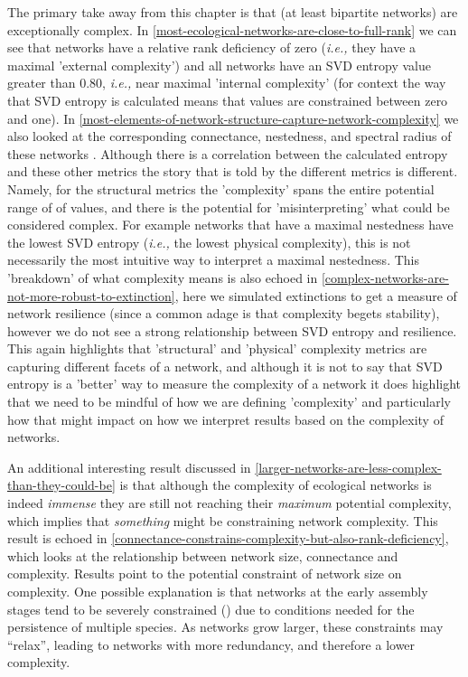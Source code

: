 \begin{refsection}
The primary take away from this chapter is that (at least bipartite networks) are exceptionally complex. In \autoref{most-ecological-networks-are-close-to-full-rank} we can see that networks have a relative rank deficiency of zero (\emph{i.e.,} they have a maximal 'external complexity') and all networks have an SVD entropy value greater than 0.80, \emph{i.e.,} near maximal 'internal complexity' (for context the way that SVD entropy is calculated means that values are constrained between zero and one). In \autoref{most-elements-of-network-structure-capture-network-complexity} we also looked at the corresponding connectance, nestedness, and spectral radius of these networks . Although there is a correlation between the calculated entropy and these other metrics the story that is told by the different metrics is different. Namely, for the structural metrics the 'complexity' spans the entire potential range of of values, and there is the potential for 'misinterpreting' what could be considered complex. For example networks that have a maximal nestedness have the lowest SVD entropy (\emph{i.e.,} the lowest physical complexity), this is not necessarily the most intuitive way to interpret a maximal nestedness. This 'breakdown' of what complexity means is also echoed in \autoref{complex-networks-are-not-more-robust-to-extinction}, here we simulated extinctions to get a measure of network resilience (since a common adage is that complexity begets stability), however we do not see a strong relationship between SVD entropy and resilience. This again highlights that 'structural' and 'physical' complexity metrics are capturing different facets of a network, and although it is not to say that SVD entropy is a 'better' way to measure the complexity of a network it does highlight that we need to be mindful of how we are defining 'complexity' and particularly how that might impact on how we interpret results based on the complexity of networks.

An additional interesting result discussed in \autoref{larger-networks-are-less-complex-than-they-could-be} is that although the complexity of ecological networks is indeed \emph{immense} they are still not reaching their \emph{maximum} potential complexity, which implies that \emph{something} might be constraining network complexity. This result is echoed in \autoref{connectance-constrains-complexity-but-also-rank-deficiency}, which looks at the relationship between network size, connectance and complexity. Results point to the potential constraint of network size on complexity. One possible explanation is that networks at the early assembly stages tend to be severely constrained (\cite{Barbier2018GenAss, Saravia2018EcoNet}) due to conditions needed for the persistence of multiple species. As networks grow larger, these constraints may ``relax'', leading to networks with more redundancy, and therefore a lower complexity.


\end{refsection}
